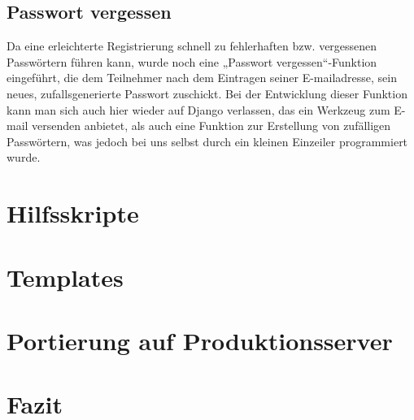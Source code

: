 \documentclass[titlepage, 12pt,a4paper]{scrartcl}
\begin{document}
\subsection{Passwort vergessen}
Da eine erleichterte Registrierung schnell zu fehlerhaften bzw. vergessenen 
Passwörtern führen kann, wurde noch eine „Passwort vergessen“-Funktion 
eingeführt, die dem Teilnehmer nach dem Eintragen seiner E-mailadresse, sein 
neues, zufallsgenerierte Passwort zuschickt. Bei der Entwicklung dieser
Funktion  kann man sich auch hier wieder auf Django verlassen, das ein Werkzeug
zum E-mail versenden anbietet, als auch eine Funktion zur Erstellung von 
zufälligen Passwörtern, was jedoch bei uns selbst durch ein kleinen Einzeiler 
programmiert wurde.

\section{Hilfsskripte}\label{hilfsskripte}

\section{Templates}
\section{Portierung auf Produktionsserver}
\section{Fazit}
\end{document}
